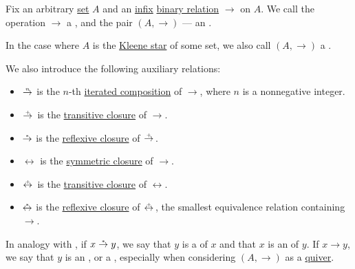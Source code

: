 \begin{definition}\label{def:abstract_reduction_system}
  Fix an arbitrary \hyperref[def:set]{set} \( A \) and an \hyperref[rem:first_order_formula_conventions/infix]{infix} \hyperref[def:binary_relation]{binary relation} \( \to \) on \( A \). We call the operation \( \to \) a , and the pair \( (A, \to) \) --- an .

  In the case where \( A \) is the \hyperref[def:formal_language/kleene_star]{Kleene star} of some set, we also call \( (A, \to) \) a .

  \begin{thmenum}
     We also introduce the following auxiliary relations:
    \begin{itemize}
      \item \( \reloset n \to \) is the \( n \)-th \hyperref[def:binary_relation/composition]{iterated composition} of \( \to \), where \( n \) is a nonnegative integer.

      \item \( \reloset + \to \) is the \hyperref[def:relation_closures/transitive]{transitive closure} of \( \to \).

      \item \( \reloset {*} \to \) is the \hyperref[def:relation_closures/reflexive]{reflexive closure} of \( \reloset + \to \).

      \item \( {\leftrightarrow} \) is the \hyperref[def:relation_closures/symmetric]{symmetric closure} of \( \to \).

      \item \( \reloset + \leftrightarrow \) is the \hyperref[def:relation_closures/transitive]{transitive closure} of \( \leftrightarrow \).

      \item \( \reloset {*} \leftrightarrow \) is the \hyperref[def:relation_closures/reflexive]{reflexive closure} of \( \reloset + \leftrightarrow \), the smallest equivalence relation containing \( \to \).
    \end{itemize}

     In analogy with , if \( x \reloset {*} \to y \), we say that \( y \) is a  of \( x \) and that \( x \) is an  of \( y \). If \( x \to y \), we say that \( y \) is an , or a , especially when considering \( (A, \to) \) as a \hyperref[def:quiver]{quiver}.


\end{thmenum}
\end{definition}
